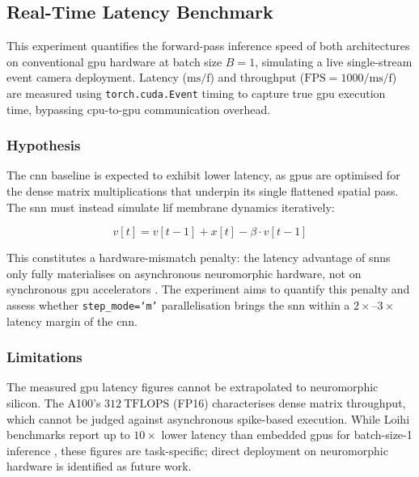 \subsection{Real-Time Latency Benchmark}
\label{subsec:exp_latency_setup}

This experiment quantifies the forward-pass inference speed of both architectures
on conventional \gls{gpu} hardware at batch size $B=1$, simulating a live 
single-stream event camera deployment. Latency ($\text{ms/f}$) and throughput 
($\text{FPS} = 1000 / \text{ms/f}$) are measured using \texttt{torch.cuda.Event} 
timing to capture true \gls{gpu} execution time, bypassing \gls{cpu}-to-\gls{gpu} 
communication overhead.

\subsubsection{Hypothesis}
The \gls{cnn} baseline is expected to exhibit lower latency, as \glspl{gpu} are 
optimised for the dense matrix multiplications that underpin its single flattened 
spatial pass. The \gls{snn} must instead simulate \gls{lif} membrane dynamics 
iteratively:

\begin{equation}
    v[t] = v[t-1] + x[t] - \beta \cdot v[t-1]
    \label{eq:lif_update_latency}
\end{equation}

\noindent This constitutes a hardware-mismatch penalty: the latency advantage of 
\glspl{snn} only fully materialises on asynchronous neuromorphic hardware, not on 
synchronous \gls{gpu} accelerators \cite{davies2018loihi, blouw2019benchmarking}. 
The experiment aims to quantify this penalty and assess whether \texttt{step\_mode=`m'} 
parallelisation \cite{fang2023spikingjelly} brings the \gls{snn} within a 
$2\times$--$3\times$ latency margin of the \gls{cnn}.

\subsubsection{Limitations}
The measured \gls{gpu} latency figures cannot be extrapolated to neuromorphic 
silicon. The A100's $312\ \text{TFLOPS}$ (FP16) characterises dense matrix 
throughput, which cannot be judged against asynchronous spike-based execution. 
While Loihi benchmarks report up to $10\times$ lower latency than embedded
\glspl{gpu} for batch-size-1 inference \cite{davies2018loihi}, these figures are
task-specific; direct deployment on neuromorphic hardware is identified as future
work.